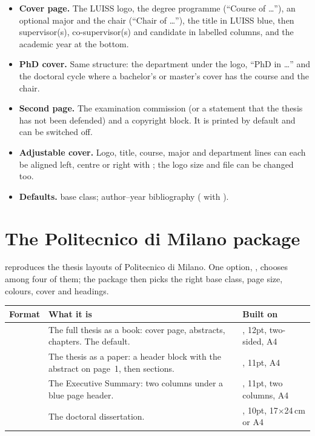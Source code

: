 \documentclass[11pt,a4paper]{article}
\begin{document}
\begin{itemize}
  \item \textbf{Cover page.} The LUISS logo, the degree programme
    (``Course of \dots''), an optional major and the chair (``Chair of
    \dots''), the title in LUISS blue, then supervisor(s), co-supervisor(s)
    and candidate in labelled columns, and the academic year at the bottom.
  \item \textbf{PhD cover.} Same structure: the department under the logo,
    ``PhD in \dots'' and the doctoral cycle where a bachelor's or master's
    cover has the course and the chair.
  \item \textbf{Second page.} The examination commission (or a statement
    that the thesis has not been defended) and a copyright block. It is
    printed by default and can be switched off.
  \item \textbf{Adjustable cover.} Logo, title, course, major and
    department lines can each be aligned left, centre or right with
    ; the logo size and file can be changed too.
  \item \textbf{Defaults.}  base class; author--year
    bibliography ( with ).
\end{itemize}

\section{The Politecnico di Milano package}

 reproduces the thesis layouts of Politecnico di
Milano. One option, , chooses among four of them; the package
then picks the right base class, page size, colours, cover and headings.

\begin{center}
  \hfill
  \hfill
  \hfill
\end{center}

\begin{tabularx}{\textwidth}{@{}l Y l@{}}
\toprule
\textbf{Format} & \textbf{What it is} & \textbf{Built on} \\
\midrule
{} & The full thesis as a book: cover page, abstracts, chapters. The default. & , 12pt, two-sided, A4 \\
   & The thesis as a paper: a header block with the abstract on page~1, then sections. & , 11pt, A4 \\
   & The Executive Summary: two columns under a blue page header. & , 11pt, two columns, A4 \\
       & The doctoral dissertation. & , 10pt, 17$\times$24\,cm or A4 \\
\bottomrule
\end{tabularx}
\end{document}

